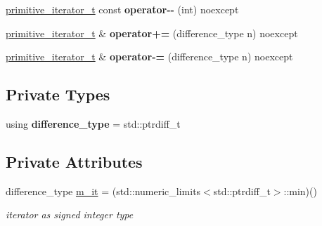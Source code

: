 \begin{DoxyCompactItemize}
\mbox{\hyperlink{classnlohmann_1_1detail_1_1primitive__iterator__t}{primitive\+\_\+iterator\+\_\+t}} const {\bfseries operator-\/-\/} (int) noexcept
\item 
\mbox{\label{classnlohmann_1_1detail_1_1primitive__iterator__t_aee01535df0b3b40137d9241029a9a203}} 
\mbox{\hyperlink{classnlohmann_1_1detail_1_1primitive__iterator__t}{primitive\+\_\+iterator\+\_\+t}} \& {\bfseries operator+=} (difference\+\_\+type n) noexcept
\item 
\mbox{\label{classnlohmann_1_1detail_1_1primitive__iterator__t_a0bf83ab08abe1ae4b51c790c85cdf151}} 
\mbox{\hyperlink{classnlohmann_1_1detail_1_1primitive__iterator__t}{primitive\+\_\+iterator\+\_\+t}} \& {\bfseries operator-\/=} (difference\+\_\+type n) noexcept
\end{DoxyCompactItemize}
\subsection*{Private Types}
\begin{DoxyCompactItemize}
\item 
\mbox{\label{classnlohmann_1_1detail_1_1primitive__iterator__t_af3db0d5c90de427d51645fe73a015553}} 
using {\bfseries difference\+\_\+type} = std\+::ptrdiff\+\_\+t
\end{DoxyCompactItemize}
\subsection*{Private Attributes}
\begin{DoxyCompactItemize}
\item 
\mbox{\label{classnlohmann_1_1detail_1_1primitive__iterator__t_a4357355113b0cd7e12b15c2e93703510}} 
difference\+\_\+type \mbox{\hyperlink{classnlohmann_1_1detail_1_1primitive__iterator__t_a4357355113b0cd7e12b15c2e93703510}{m\+\_\+it}} = (std\+::numeric\+\_\+limits$<$std\+::ptrdiff\+\_\+t$>$\+::min)()
\begin{DoxyCompactList}\small\item\em iterator as signed integer type \end{DoxyCompactList}\end{DoxyCompactItemize}
